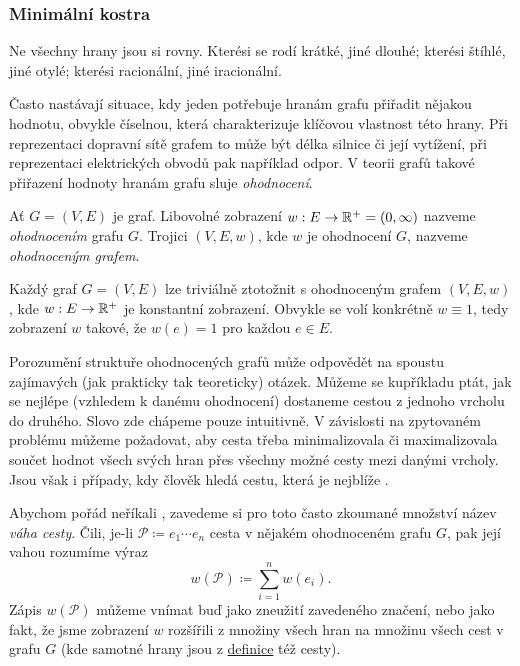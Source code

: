 \subsubsection{Minimální kostra}
\label{sssec:minimalni-kostra}

Ne všechny hrany jsou si rovny. Kterési se rodí krátké, jiné dlouhé; kterési
štíhlé, jiné otylé; kterési racionální, jiné iracionální.

Často nastávají situace, kdy jeden potřebuje hranám grafu přiřadit nějakou
hodnotu, obvykle číselnou, která charakterizuje klíčovou vlastnost této hrany.
Při reprezentaci dopravní sítě grafem to může být délka silnice či její
vytížení, při reprezentaci elektrických obvodů pak například odpor. V teorii
grafů takové přiřazení hodnoty hranám grafu sluje \emph{ohodnocení}.

\begin{definition}
\label{def:ohodnoceny-graf}
 Ať $G = (V,E)$ je graf. Libovolné zobrazení $w: E \to \mathbb{R}^{+} = (0,\infty)$ 
 nazveme \emph{ohodnocením} grafu $G$. Trojici $(V,E,w)$, kde $w$ je ohodnocení
 $G$, nazveme \emph{ohodnoceným grafem}.
\end{definition}

\begin{remark}
 Každý graf $G = (V,E)$ lze triviálně ztotožnit s ohodnoceným grafem $(V,E,w)$,
 kde $w: E \to \mathbb{R}^{+}$ je konstantní zobrazení. Obvykle se volí konkrétně $w
 \equiv 1$, tedy zobrazení $w$ takové, že $w(e) = 1$ pro každou $e \in E$.
\end{remark}

Porozumění struktuře ohodnocených grafů může odpovědět na spoustu zajímavých
(jak prakticky tak teoreticky) otázek. Můžeme se kupříkladu ptát, jak se nejlépe
(vzhledem k danému ohodnocení) dostaneme cestou z jednoho vrcholu do druhého.
Slovo  zde chápeme pouze intuitivně. V závislosti na zpytovaném
problému můžeme požadovat, aby cesta třeba minimalizovala či maximalizovala
součet hodnot všech svých hran přes všechny možné cesty mezi danými vrcholy.
Jsou však i případy, kdy člověk hledá cestu, která je nejblíže .

Abychom pořád neříkali , zavedeme si pro
toto často zkoumané množství název \emph{váha cesty}. Čili, je-li $\mathcal{P}
\coloneqq e_1 \cdots e_n$ cesta v nějakém ohodnoceném grafu $G$, pak její vahou
rozumíme výraz
\[
 w(\mathcal{P}) \coloneqq \sum_{i=1}^{n} w(e_i).
\]
Zápis $w(\mathcal{P})$ můžeme vnímat buď jako zneužití zavedeného značení, nebo
jako fakt, že jsme zobrazení $w$ rozšířili z množiny všech hran na množinu všech
cest v grafu $G$ (kde samotné hrany jsou z \hyperref[def:cesta]{definice} též
cesty).


